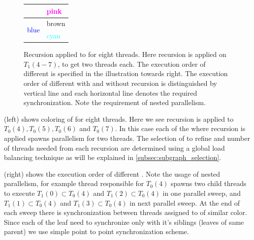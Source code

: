 \begin{figure}[H]
\begin{minipage}[c]{0.4\textwidth}
\begin{tabular}{l|l}
	       	   \cmidrule(lr){2-2}
	       		& {\textcolor{magenta}{pink}}\\
	       		\midrule
	       	   \multirow{2}{*}{\textcolor{blue}{blue}} & {\textcolor{carmine}{brown}}\\
	       	   \cmidrule(lr){2-2}
	       	   & {\textcolor{cyan}{cyan}}\\
	       	   \bottomrule
	       	\end{tabular}
       		\caption{Recursion applied to \stex for eight threads. Here recursion is applied on \levelGroups $T_1(4-7)$, to get two threads each. The execution order of different \levelGroup is specified in the illustration towards right. The execution order of different \levelGroups with and without recursion is distinguished by vertical line and each horizontal line denotes the required synchronization. Note the requirement of nested parallelism.}
       		\label{fig:rec_2d-7pt_graph}
       	\end{minipage}
       \end{figure}
     
      (left) shows \DTWO coloring of \stex  for eight threads. Here we see recursion is applied to \levelGroups $T_0(4),T_0(5),T_0(6)$ and $T_0(7)$. In this case each of the \levelGroups where recursion is applied spawns parallelism for two threads. The selection of \levelGroups to refine and number of threads needed from each recursion are determined using a global load balancing technique as will be explained in \cref{subsec:subgraph_selection}.
     
       (right) shows the execution order of different \levelGroups. Note the usage of nested parallelism, \ie for example thread responsible for $T_0(4)$ spawns two child threads to execute $T_1(0) \subset T_0(4)$ and $T_1(2) \subset T_0(4)$ in one parallel sweep, and $T_1(1) \subset T_0(4)$ and $T_1(3) \subset T_0(4)$ in next parallel sweep. At the end of each sweep there is synchronization between threads assigned to \levelGroup of similar color. Since each of the leaf need to synchronize only with it's siblings (leaves of same parent)  we use simple point to point synchronization scheme. 
          
       

